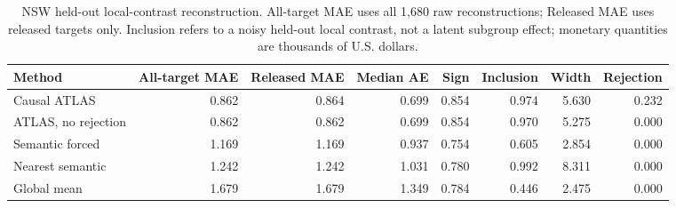 \begin{table}[t]
\centering
\small
\setlength{\tabcolsep}{3.5pt}
\caption{NSW held-out local-contrast reconstruction. All-target MAE uses all 1,680 raw reconstructions; Released MAE uses released targets only. Inclusion refers to a noisy held-out local contrast, not a latent subgroup effect; monetary quantities are thousands of U.S. dollars.}
\label{tab:v1-nsw}
\begin{tabular}{lrrrrrrr}
\toprule
Method & All-target MAE & Released MAE & Median AE & Sign & Inclusion & Width & Rejection \\
\midrule
Causal ATLAS & 0.862 & 0.864 & 0.699 & 0.854 & 0.974 & 5.630 & 0.232 \\
ATLAS, no rejection & 0.862 & 0.862 & 0.699 & 0.854 & 0.970 & 5.275 & 0.000 \\
Semantic forced & 1.169 & 1.169 & 0.937 & 0.754 & 0.605 & 2.854 & 0.000 \\
Nearest semantic & 1.242 & 1.242 & 1.031 & 0.780 & 0.992 & 8.311 & 0.000 \\
Global mean & 1.679 & 1.679 & 1.349 & 0.784 & 0.446 & 2.475 & 0.000 \\
\bottomrule
\end{tabular}
\end{table}
